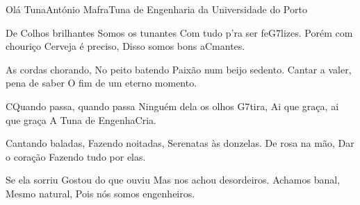 \begin{musica}{Olá Tuna}{António Mafra}{Tuna de Engenharia da Universidade do Porto}

De \ac{C}{o}lhos brilhantes
Somos os tunantes
Com tudo p’ra ser fe\ac{G7}{li}zes.
Porém com chouriço
Cerveja é preciso,
Disso somos bons a\ac{C}{man}tes.

As cordas chorando,
No peito batendo
Paixão num beijo sedento.
Cantar a valer, pena de saber
O fim de um eterno momento.

\ac{C}{Quan}do passa, quando passa
Ninguém dela os olhos \ac{G7}{ti}ra,
Ai que graça, ai que graça
A Tuna de Engenha\ac{C}{ria}.

Cantando baladas,
Fazendo noitadas,
Serenatas às donzelas.
De rosa na mão,
Dar o coração
Fazendo tudo por elas.

Se ela sorriu
Gostou do que ouviu
Mas nos achou desordeiros.
Achamos banal,
Mesmo natural,
Pois nós somos engenheiros.


\end{musica}
